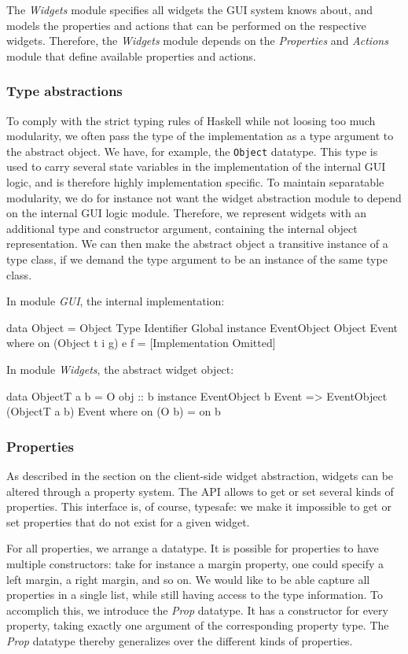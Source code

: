 \documentclass[11pt,a4paper]{article}
\begin{document}
The \textit{Widgets} module specifies all widgets the GUI system knows about, and models the properties and actions that can be performed on the respective widgets.
Therefore, the \textit{Widgets} module depends on the \textit{Properties} and \textit{Actions} module that define available properties and actions.

\subsubsection{Type abstractions}
To comply with the strict typing rules of Haskell while not loosing too much modularity, we often pass the type of the implementation as a type argument to the abstract object.
We have, for example, the \texttt{Object} datatype.
This type is used to carry several state variables in the implementation of the internal GUI logic, and is therefore highly implementation specific.
To maintain separatable modularity, we do for instance not want the widget abstraction module to depend on the internal GUI logic module.
Therefore, we represent widgets with an additional type and constructor argument, containing the internal object representation.
We can then make the abstract object a transitive instance of a type class, if we demand the type argument to be an instance of the same type class.

In module \textit{GUI}, the internal implementation:
\begin{haskell}
data Object = Object Type Identifier Global
instance EventObject Object Event where
    on (Object t i g) e f = [Implementation Omitted]
\end{haskell}

In module \textit{Widgets}, the abstract widget object:
\begin{haskell}
data ObjectT a b = O { obj :: b }
instance EventObject b Event => EventObject (ObjectT a b) Event where
    on (O b) = on b
\end{haskell}

\subsubsection{Properties}
As described in the section on the client-side widget abstraction, widgets can be altered through a property system.
The API allows to get or set several kinds of properties.
This interface is, of course, typesafe: we make it impossible to get or set properties that do not exist for a given widget.

For all properties, we arrange a datatype.
It is possible for properties to have multiple constructors: take for instance a margin property, one could specify a left margin, a right margin, and so on.
We would like to be able capture all properties in a single list, while still having access to the type information.
To accomplich this, we introduce the \textit{Prop} datatype.
It has a constructor for every property, taking exactly one argument of the corresponding property type.
The \textit{Prop} datatype thereby generalizes over the different kinds of properties.
\end{document}
